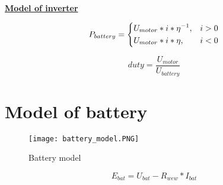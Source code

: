 \documentclass[a4paper,14pt,twoside]{extreport}
\begin{document}
\textbf{\underline{Model of inverter}}

\[\begin{equation}
    P_{battery}= 
\begin{dcases}
    U_{motor}*i*\eta^{-1},&  i > 0\\
    U_{motor}*i*\eta,&        i < 0
\end{dcases}
\end{equation}\]


\begin{equation}
duty = \frac{U_{motor}}{U_{battery}}
\end{equation}

\section{Model of battery}
\begin{figure}[H]
  \centerline{\texttt{[image: battery\_model.PNG]}} 
  \caption{Battery model}
\end{figure}

\begin{equation}
E_{bat} = U_{bat} - R_{wew}*I_{bat}
\end{equation}
\end{document}
